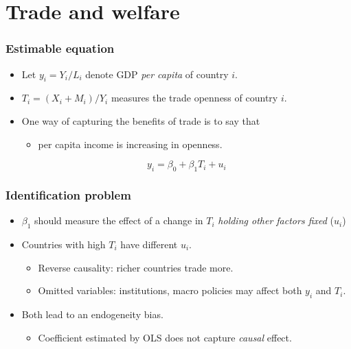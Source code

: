 \documentclass[compress,mathserif,aspectratio=169]{beamer}
\begin{document}
\section{Trade and welfare}\hypertarget{Trade and welfare}{}
\begin{frame}\frametitle{Estimable equation}\hypertarget{Estimable equation}{}
\begin{itemize}
\item Let $y_i=Y_i/L_i$ denote GDP \emph{per capita} of country $i$.

\item $T_i=(X_i+M_i)/Y_i$ measures the trade openness of country $i$.

\item One way of capturing the benefits of trade is to say that
\begin{itemize}
\item per capita income is increasing in openness.
\pause


\end{itemize}

\[
y_i = \beta_0 + \beta_1 T_i + u_i
\]


\end{itemize}
\end{frame}



\begin{frame}\frametitle{Identification problem}\hypertarget{Identification problem}{}
\begin{itemize}
\item $\beta_1$ should measure the effect of a change in $T_i$ \emph{holding other factors fixed} ($u_i$)

\item Countries with high $T_i$ have different $u_i$.
\begin{itemize}
\item \alert{Reverse causality}: richer countries trade more.

\item \alert{Omitted variables}: institutions, macro policies may affect both $y_i$ and $T_i$.
\end{itemize}

\item Both lead to an \alert{endogeneity bias}.
\begin{itemize}
\item Coefficient estimated by OLS does not capture \emph{causal} effect.


\end{itemize}

\end{itemize}
\end{frame}
\end{document}
